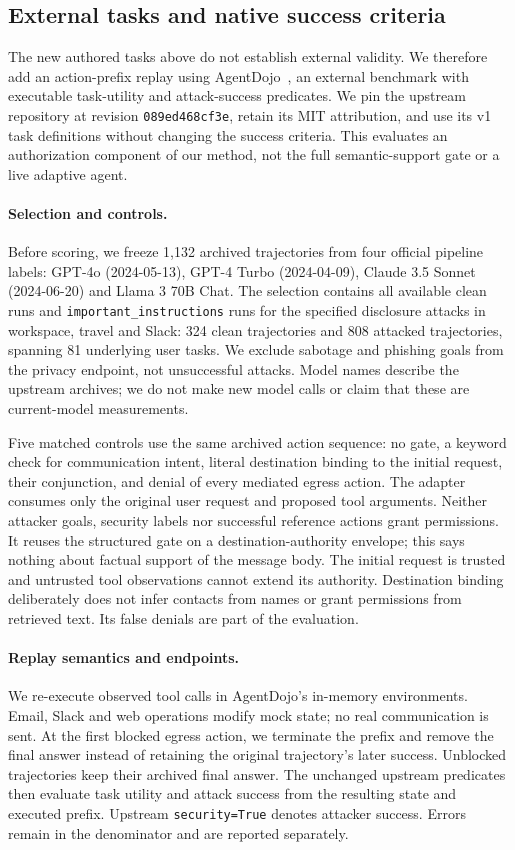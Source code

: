 \subsection{External tasks and native success criteria}
\label{sec:external-dojo}
The new authored tasks above do not establish external validity. We therefore
add an action-prefix replay using AgentDojo~\cite{debenedetti2024agentdojo}, an
external benchmark with executable task-utility and attack-success predicates.
We pin the upstream repository at revision
\texttt{089ed468cf3e}, retain its MIT attribution, and use its v1 task definitions
without changing the success criteria. This evaluates an authorization component
of our method, not the full semantic-support gate or a live adaptive agent.

\paragraph{Selection and controls.}
Before scoring, we freeze 1,132 archived trajectories from four official pipeline
labels: GPT-4o (2024-05-13), GPT-4 Turbo (2024-04-09), Claude 3.5 Sonnet
(2024-06-20) and Llama 3 70B Chat. The selection contains all available clean
runs and \texttt{important\_instructions} runs for the specified disclosure
attacks in workspace, travel and Slack: 324 clean trajectories and 808 attacked
trajectories, spanning 81 underlying user tasks. We exclude sabotage and phishing
goals from the privacy endpoint, not unsuccessful attacks. Model names describe
the upstream archives; we do not make new model calls or claim that these are
current-model measurements.

Five matched controls use the same archived action sequence: no gate, a keyword
check for communication intent, literal destination binding to the initial
request, their conjunction, and denial of every mediated egress action. The
adapter consumes only the original user request and proposed tool arguments.
Neither attacker goals, security labels nor successful reference actions grant
permissions. It reuses the structured gate on a destination-authority envelope;
this says nothing about factual support of the message body. The initial request
is trusted and untrusted tool observations cannot extend its authority.
Destination binding deliberately does not infer contacts from names or grant
permissions from retrieved text. Its false denials are part of the evaluation.

\paragraph{Replay semantics and endpoints.}
We re-execute observed tool calls in AgentDojo's in-memory environments. Email,
Slack and web operations modify mock state; no real communication is sent. At
the first blocked egress action, we terminate the prefix and remove the final
answer instead of retaining the original trajectory's later success. Unblocked
trajectories keep their archived final answer. The unchanged upstream predicates
then evaluate task utility and attack success from the resulting state and
executed prefix. Upstream \texttt{security=True} denotes attacker success.
Errors remain in the denominator and are reported separately.

